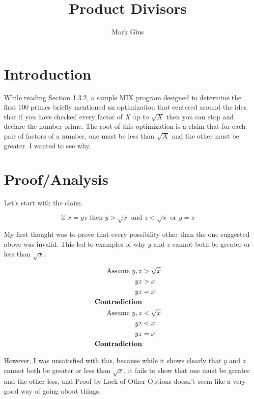 \documentclass[10pt]{article}
\begin{document}
\author{Mark Gius}
\title{Product Divisors}
\maketitle

\section{Introduction}

While reading Section 1.3.2, a sample MIX program designed to determine the first 100 primes briefly mentioned an optimization that centered around the idea that if you have checked every factor of $X$ up to $ \sqrt{X} $ then you can stop and declare the number prime. The root of this optimization is a claim that for each pair of factors of a number, one must be less than $ \sqrt{X} $ and the other must be greater.  I wanted to see why.

\section{Proof/Analysis}

Let's start with the claim.

\[
\textrm{if } x = yz \textrm{ then } y > \sqrt{x} \textrm{ and } z < \sqrt{x} \textrm{ or } y = z
\]

My first thought was to prove that every possibility other than the one suggested above was invalid.  This led to examples of why $y$ and $z$ cannot both be greater or less than $\sqrt{x}$.

\begin{align*}
\textrm{Assume } y,z &> \sqrt{x} \\
yz &> x \\
yz &= x \\
\textbf{Contradiction} \\
\newline
\textrm{Assume } y,z &< \sqrt{x} \\
yz &< x \\
yz &= x \\
\textbf{Contradiction} \\
\end{align*}

However, I was unsatisfied with this, because while it shows clearly that $y$ and $z$ cannot both be greater or less than $\sqrt{x}$, it fails to show that one must be greater and the other less, and Proof by Lack of Other Options doesn't seem like a very good way of going about things.  
\end{document}
